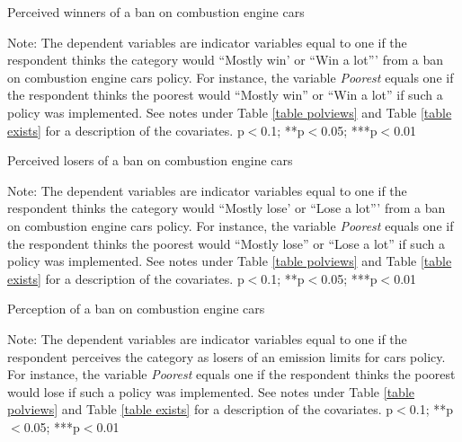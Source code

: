 \documentclass{article}
\begin{document}
\begin{table}[h!]
	\caption{Perceived winners of a ban on combustion engine cars}
	\begin{center}
		\scalebox{0.7}{}
	\end{center}
	{\footnotesize Note: The dependent variables are indicator variables equal to one if the respondent thinks the category would ``Mostly win' or ``Win a lot''' from a ban on combustion engine cars policy. For instance, the variable \textit{Poorest} equals one if the respondent thinks the poorest would ``Mostly win'' or ``Win a lot'' if such a policy was implemented. See notes under Table \ref{table polviews} and Table \ref{table exists} for a description of the covariates.
	\newline *p$<$0.1; **p$<$0.05; ***p$<$0.01}
\end{table}	

\begin{table}[h!]
	\caption{Perceived losers of a ban on combustion engine cars}
	\begin{center}
		\scalebox{0.7}{}
	\end{center}
	{\footnotesize Note: The dependent variables are indicator variables equal to one if the respondent thinks the category would ``Mostly lose' or ``Lose a lot''' from a ban on combustion engine cars policy. For instance, the variable \textit{Poorest} equals one if the respondent thinks the poorest would ``Mostly lose'' or ``Lose a lot'' if such a policy was implemented. See notes under Table \ref{table polviews} and Table \ref{table exists} for a description of the covariates.
	\newline *p$<$0.1; **p$<$0.05; ***p$<$0.01}
\end{table}	


\begin{table}[h!]
	\caption{Perception of a ban on combustion engine cars}
	\begin{center}
		\scalebox{0.7}{}
	\end{center}
	{\footnotesize Note: The dependent variables are indicator variables equal to one if the respondent perceives the category as losers of an emission limits for cars policy. For instance, the variable \textit{Poorest} equals one if the respondent thinks the poorest would lose if such a policy was implemented. See notes under Table \ref{table polviews} and Table \ref{table exists} for a description of the covariates.
	\newline *p$<$0.1; **p$<$0.05; ***p$<$0.01}
\end{table}	
\end{document}
